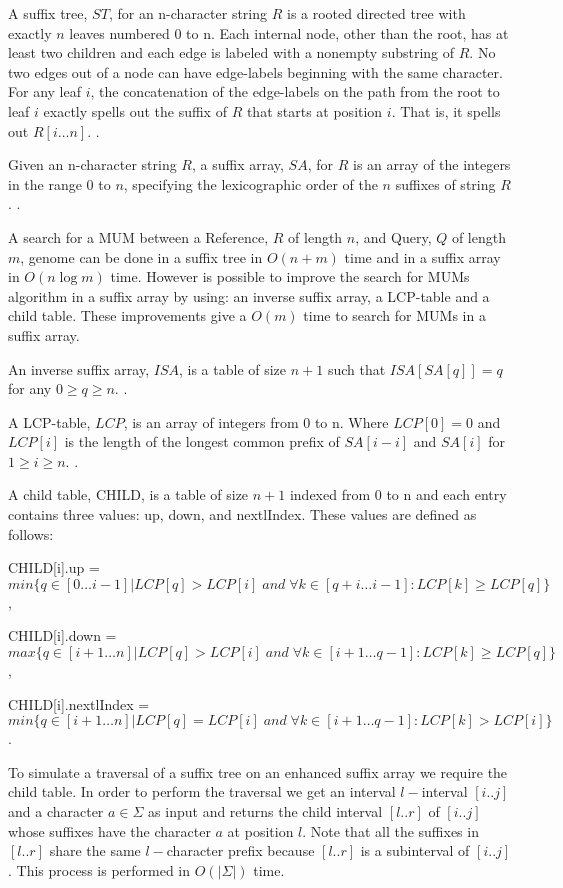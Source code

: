 \documentclass{acm_proc_article-sp}
\begin{document}
\begin{definition}
A suffix tree, $ST$, for an n-character string $R$ is a rooted directed tree with exactly $n$ leaves numbered 0 to n. Each internal node, other than the root, has at least two children and each edge is labeled with a nonempty substring of $R$. No two edges out of a node can have edge-labels beginning with the same character. For any leaf $i$, the concatenation of the edge-labels on the path from the root to leaf $i$ exactly spells out the suffix of $R$ that starts at position $i$. That is, it spells out $R[i\ldots n]$. \cite{Gusfield1997}.
\end{definition}
\begin{definition}
Given an n-character string $R$, a suffix array, $SA$, for $R$ is an array of the integers in the range 0 to $n$, specifying the lexicographic order of the $n$ suffixes of string $R$. \cite{Gusfield1997}.
\end{definition}
A search for a MUM between a Reference, $R$ of length $n$, and Query, $Q$ of length $m$, genome can be done in a suffix tree in $O(n+m)$ time and in a suffix array in $O(n\log m)$ time. However is possible to improve the search for MUMs algorithm in a suffix array by using: an inverse suffix array, a LCP-table and a child table. These improvements give a $O(m)$ time \cite{Abouelhoda2004} to search for MUMs in a suffix array.
\begin{definition}
An inverse suffix array, $ISA$, is a table of size $n+1$ such that $ISA[SA[q]]=q$ for any $0\geq q\geq n$. \cite{Abouelhoda2004}.
\end{definition}
\begin{definition}
A LCP-table, $LCP$, is an array of integers from 0 to n. Where $LCP[0]=0$ and $LCP[i]$ is the length of the longest common prefix of $SA[i-i]$ and $SA[i]$ for $1\geq i \geq n$. \cite{Abouelhoda2004}.
\end{definition}
\begin{definition}
A child table, CHILD, is a table of size $n+1$ indexed from 0 to n and each entry contains three values: up, down, and nextlIndex. These values are defined as follows: 

CHILD[i].up = $min\{q\in [0\ldots i-1]|LCP[q]>LCP[i]\;and\;\forall k\in[q+i\ldots i-1]:LCP[k]\geq LCP[q]\}$,

CHILD[i].down = $max\{q\in[i+1\ldots n]|LCP[q]>LCP[i]\;and\;\forall k\in[i+1\ldots q-1]:LCP[k]\geq LCP[q]\}$,

CHILD[i].nextlIndex = $min\{q\in[i+1\ldots n]|LCP[q]=LCP[i]\;and\;\forall k\in[i+1\ldots q-1]:LCP[k]>LCP[i]\}$.
\end{definition}
To simulate a traversal of a suffix tree on an enhanced suffix array we require the child table. In order to perform the traversal we get an interval $l-$interval $[i..j]$ and a character $a\in \Sigma$ as input and returns the child interval $[l..r]$ of $[i..j]$ whose suffixes have the character $a$ at position $l$. Note that all the suffixes in $[l..r]$ share the same $l-$character prefix because $[l..r]$ is a subinterval of $[i..j]$. This process is performed in $O(|\Sigma|)$ time.
\end{document}
